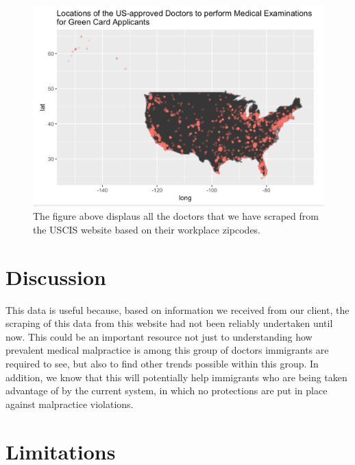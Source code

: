 \documentclass[10pt,letterpaper]{article}
\begin{document}
\begin{figure}
\includegraphics[width=1\linewidth]{ResultsMap} \caption{The figure above displaus all the doctors that we have scraped from the USCIS website based on their workplace zipcodes.}\label{fig:unnamed-chunk-5}
\end{figure}

\hypertarget{discussion}{%
\section{Discussion}\label{discussion}}

This data is useful because, based on information we received from our
client, the scraping of this data from this website had not been
reliably undertaken until now. This could be an important resource not
just to understanding how prevalent medical malpractice is among this
group of doctors immigrants are required to see, but also to find other
trends possible within this group. In addition, we know that this will
potentially help immigrants who are being taken advantage of by the
current system, in which no protections are put in place against
malpractice violations.

\hypertarget{limitations}{%
\section{Limitations}\label{limitations}}
\end{document}
